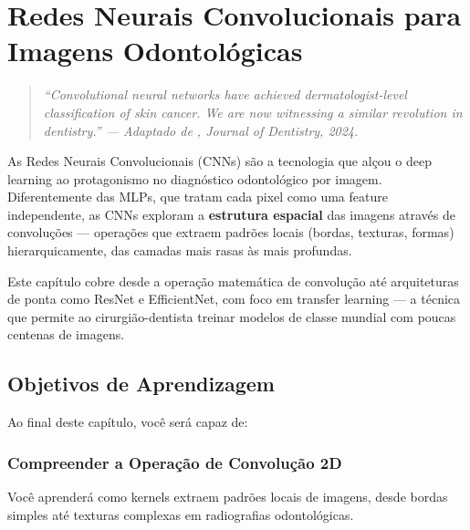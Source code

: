 
\chapter{Redes Neurais Convolucionais para Imagens Odontológicas}
\label{cap:cnns-imagens}

\niveltres

\begin{quote}
\itshape\small
``Convolutional neural networks have achieved dermatologist-level classification
of skin cancer. We are now witnessing a similar revolution in dentistry.''
--- Adaptado de , Journal of Dentistry, 2024.
\end{quote}

As Redes Neurais Convolucionais (CNNs) são a tecnologia que alçou o deep learning
ao protagonismo no diagnóstico odontológico por imagem. Diferentemente das MLPs,
que tratam cada pixel como uma feature independente, as CNNs exploram a
\textbf{estrutura espacial} das imagens através de convoluções --- operações que
extraem padrões locais (bordas, texturas, formas) hierarquicamente, das camadas
mais rasas às mais profundas.

Este capítulo cobre desde a operação matemática de convolução até arquiteturas
de ponta como ResNet e EfficientNet, com foco em transfer learning --- a técnica
que permite ao cirurgião-dentista treinar modelos de classe mundial com poucas
centenas de imagens.


\section{Objetivos de Aprendizagem}

Ao final deste capítulo, você será capaz de:

\subsection{Compreender a Operação de Convolução 2D}
Você aprenderá como kernels extraem padrões locais de imagens, desde bordas simples até texturas complexas em radiografias odontológicas.

